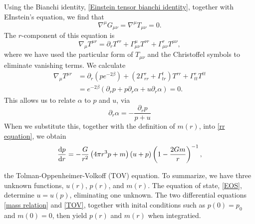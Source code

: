 Using the Bianchi identity, \autoref{Einstein tensor bianchi identity}, together with EInstein's equation, we find that
%
\begin{equation}
    \nabla^\mu G_{\mu \nu} = \nabla^\mu T_{\mu \nu} = 0.
\end{equation}
%
The $r$-component of this equation is
%
\begin{equation}
    \nabla_\mu T^{\mu r} 
    =
    \partial_r T^{rr} 
    + \Gamma^\mu_{\mu \nu} T^{\nu r} 
    + \Gamma^r_{\mu \nu} T^{\mu \nu},
\end{equation}
%
where we have used the particular form of $T_{\mu \nu}$ and the Christoffel symbols to eliminate vanishing terms.
We calculate
%
\begin{align*}
    \nabla_\mu T^{\mu r} 
    & = 
    \partial_r \left(p e^{-2\beta}\right)
    + (2 \Gamma^r_{rr} + \Gamma^t_{tr}) T^{rr} 
    + \Gamma^r_{tt}T^{tt} \\ 
    &=   e^{-2\beta} \left( \partial_r p + p \partial_r \alpha + u \partial_r \alpha \right) = 0.
\end{align*} 
%
This allows us to relate $\alpha$ to $p$ and $u$, via
\begin{equation}
    \partial_r \alpha = - \frac{\partial_r p}{p + u}
\end{equation}
%
When we substitute this, together with the definition of $m(r)$, into \autoref{rr equation}, we obtain
%
\begin{equation}
    \label{TOV}
    \diff{p}{r}
    =
    -
    \frac{G}{r^2} 
    \left(4 \pi r^{3} p + m \right) 
    \left(u + p \right)
    \left(1 - \frac{2 G m}{r}\right)^{-1},
\end{equation}
%


the Tolman-Oppenheimer-Volkoff (TOV) equation.
To summarize, we have three unknown functions, $u(r)$, $p(r)$, and $m(r)$.
The equation of state, \autoref{EOS}, determine $u = u(p)$, eliminating one unknown.
The two differential equations \autoref{mass relation} and \autoref{TOV}, together with inital conditions such as $p(0) = p_0$ and $m(0) = 0$, then yield $p(r)$ and $m(r)$ when integratied.

